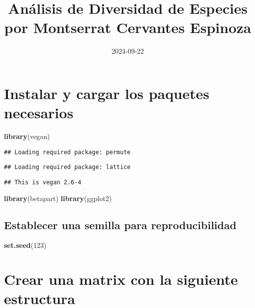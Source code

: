\documentclass[
]{article}
\title{Análisis de Diversidad de Especies por Montserrat Cervantes
Espinoza}
\author{}
\date{\vspace{-2.5em}2024-09-22}
\newenvironment{Shaded}{\begin{snugshade}}{\end{snugshade}}
\newcommand{\DecValTok}[1]{\textcolor[rgb]{0.00,0.00,0.81}{#1}}
\newcommand{\FunctionTok}[1]{\textcolor[rgb]{0.13,0.29,0.53}{\textbf{#1}}}
\newcommand{\NormalTok}[1]{#1}
\begin{document}
\maketitle

\hypertarget{instalar-y-cargar-los-paquetes-necesarios}{%
\section{Instalar y cargar los paquetes
necesarios}\label{instalar-y-cargar-los-paquetes-necesarios}}

\begin{Shaded}
\begin{Highlighting}[]
\FunctionTok{library}\NormalTok{(vegan)}
\end{Highlighting}
\end{Shaded}

\begin{verbatim}
## Loading required package: permute
\end{verbatim}

\begin{verbatim}
## Loading required package: lattice
\end{verbatim}

\begin{verbatim}
## This is vegan 2.6-4
\end{verbatim}

\begin{Shaded}
\begin{Highlighting}[]
\FunctionTok{library}\NormalTok{(betapart)}
\FunctionTok{library}\NormalTok{(ggplot2)}
\end{Highlighting}
\end{Shaded}

\hypertarget{establecer-una-semilla-para-reproducibilidad}{%
\subsection{Establecer una semilla para
reproducibilidad}\label{establecer-una-semilla-para-reproducibilidad}}

\begin{Shaded}
\begin{Highlighting}[]
\FunctionTok{set.seed}\NormalTok{(}\DecValTok{123}\NormalTok{)}
\end{Highlighting}
\end{Shaded}

\hypertarget{crear-una-matrix-con-la-siguiente-estructura}{%
\section{Crear una matrix con la siguiente
estructura}\label{crear-una-matrix-con-la-siguiente-estructura}}
\end{document}
